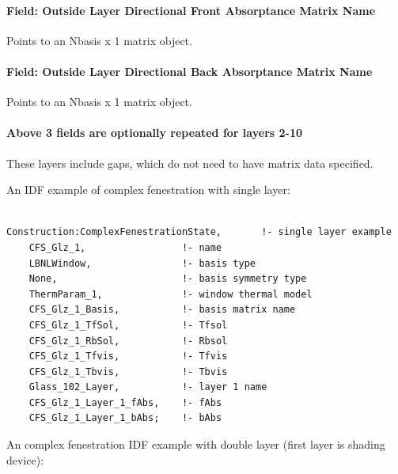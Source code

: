 \paragraph{Field: Outside Layer Directional Front Absorptance Matrix Name}\label{field-outside-layer-directional-front-absorptance-matrix-name}

Points to an Nbasis x 1 matrix object.

\paragraph{Field: Outside Layer Directional Back Absorptance Matrix Name}\label{field-outside-layer-directional-back-absorptance-matrix-name}

Points to an Nbasis x 1 matrix object.

\paragraph{Above 3 fields are optionally repeated for layers 2-10}\label{above-3-fields-are-optionally-repeated-for-layers-2-10}

These layers include gaps, which do not need to have matrix data specified.

An IDF example of complex fenestration with single layer:

\begin{lstlisting}

Construction:ComplexFenestrationState,       !- single layer example
    CFS_Glz_1,                 !- name
    LBNLWindow,                !- basis type
    None,                      !- basis symmetry type
    ThermParam_1,              !- window thermal model
    CFS_Glz_1_Basis,           !- basis matrix name
    CFS_Glz_1_TfSol,           !- Tfsol
    CFS_Glz_1_RbSol,           !- Rbsol
    CFS_Glz_1_Tfvis,           !- Tfvis
    CFS_Glz_1_Tbvis,           !- Tbvis
    Glass_102_Layer,           !- layer 1 name
    CFS_Glz_1_Layer_1_fAbs,    !- fAbs
    CFS_Glz_1_Layer_1_bAbs;    !- bAbs
\end{lstlisting}

An complex fenestration IDF example with double layer (first layer is shading device):

